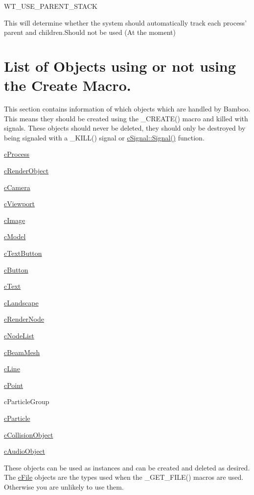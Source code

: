 \begin{DoxyItemize}
\item WT\_\-USE\_\-PARENT\_\-STACK
\begin{DoxyItemize}
\item This will determine whether the system should automatically track each process' parent and children.Should not be used (At the moment)
\end{DoxyItemize}
\end{DoxyItemize}\hypertarget{_reference_lists_ObjectsUsingTheCreateMacro}{}\section{List of Objects using or not using the Create Macro.}\label{_reference_lists_ObjectsUsingTheCreateMacro}
This section contains information of which objects which are handled by Bamboo. This means they should be created using the \_\-CREATE() macro and killed with signals. These objects should never be deleted, they should only be destroyed by being signaled with a \_\-KILL() signal or \hyperlink{classc_signal_a545074be1da41d00050bed3cd2fb2305}{cSignal::Signal()} function.
\begin{DoxyItemize}
\item \hyperlink{classc_process}{cProcess}
\item \hyperlink{classc_render_object}{cRenderObject}
\item \hyperlink{classc_camera}{cCamera}
\item \hyperlink{classc_viewport}{cViewport}
\begin{DoxyItemize}
\item \hyperlink{classc_image}{cImage}
\item \hyperlink{classc_model}{cModel}
\item \hyperlink{classc_text_button}{cTextButton}
\item \hyperlink{classc_button}{cButton}
\item \hyperlink{classc_text}{cText}
\item \hyperlink{classc_landscape}{cLandscape}
\item \hyperlink{classc_render_node}{cRenderNode}
\item \hyperlink{classc_node_list}{cNodeList}
\item \hyperlink{classc_beam_mesh}{cBeamMesh}
\item \hyperlink{classc_line}{cLine}
\item \hyperlink{classc_point}{cPoint}
\item cParticleGroup
\item \hyperlink{classc_particle}{cParticle}
\end{DoxyItemize}
\item \hyperlink{classc_collision_object}{cCollisionObject}
\item \hyperlink{classc_audio_object}{cAudioObject}
\end{DoxyItemize}These objects can be used as instances and can be created and deleted as desired. The \hyperlink{classc_file}{cFile} objects are the types used when the \_\-GET\_\-FILE() macros are used. Otherwise you are unlikely to use them.
